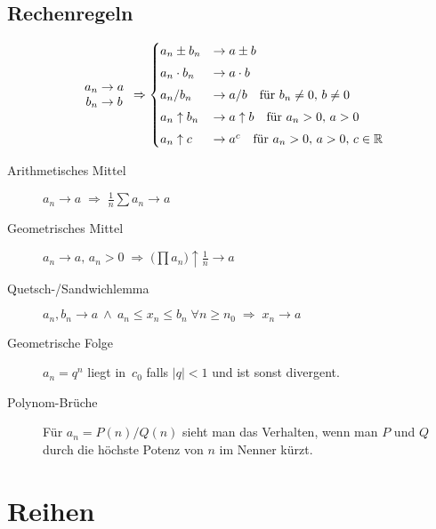 \subsection{Rechenregeln}

\nopagebreak
\[
\begin{array}{c}
	a_n\to a \\
	b_n\to b
\end{array}
\Rightarrow
\begin{cases}
	a_n\pm b_n       & \to a\pm b                                                  \\[0.3333em]
	a_n\cdot b_n     & \to a\cdot b                                                \\[0.3333em]
	a_n / b_n        & \to a/b \quad \hbox{für $b_n \neq 0, \, b \neq 0$}          \\[0.3333em]
	a_n \uparrow b_n & \to a \uparrow b \quad \hbox{für $a_n>0, \, a>0$}           \\[0.3333em]
	a_n \uparrow c   & \to a^c \quad \hbox{für $a_n>0, \, a>0, \, c\in\mathbb{R}$}
\end{cases}
\]

\begin{description}
  \item [Arithmetisches Mittel] 
	$a_n \to a \;\Rightarrow\; \frac{1}{n}\sum a_n \rightarrow a$
  \item [Geometrisches Mittel] 
	$a_n \to a, \, a_n>0 \;\Rightarrow\; \bigl( \prod a_n \bigr) \uparrow \frac{1}{n} \to a$
  \item [Quetsch-/Sandwichlemma] 
	$a_n, b_n \to a\: \land \: a_n \leq x_n \leq b_n \; \forall n\geq n_0 \; \Rightarrow \; x_n\to a$
  \item [Geometrische Folge] 
	$a_n = q^n$ liegt in~$c_0$ falls $\lvert q \rvert<1$ und ist sonst divergent.
  \item [Polynom-Brüche]
	Für $a_n = P(n)/Q(n)$ sieht man das Verhalten, wenn man $P$ und $Q$ durch die höchste Potenz von $n$ im Nenner kürzt.
\end{description}



\section{Reihen}

